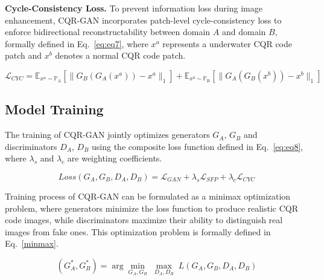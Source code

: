 \documentclass[preprint,12pt]{elsarticle}
\begin{document}
\textbf{Cycle-Consistency Loss.} To prevent information loss during image enhancement, CQR-GAN incorporates patch-level cycle-consistency loss to enforce bidirectional reconstructability between domain $A$ and domain $B$, formally defined in Eq.~\ref{eq:eq7}, where $x^a$ represents a underwater CQR code patch and $x^b$ denotes a normal CQR code patch.

\begin{equation}
    \mathcal{L}_{CYC} = \mathbb{E}_{x^a \sim \mathbb{P}_{\text{A}}} \left[ \| G_B(G_A(x^a)) - x^a \|_1 \right] + \mathbb{E}_{x^b \sim \mathbb{P}_{\text{B}}} \left[ \| G_A(G_B(x^b)) - x^b \|_1 \right]
    \label{eq:eq7}
\end{equation}


\subsection{Model Training}

The training of CQR-GAN jointly optimizes generators $G_A$, $G_B$ and discriminators $D_A$, $D_B$ using the composite loss function defined in Eq.~\ref{eq:eq8}, where $\lambda_s$ and $\lambda_c$ are weighting coefficients.

\begin{equation}
Loss(G_A,G_B,D_A,D_B)
= \mathcal{L}_{GAN}
+ \lambda_s\mathcal{L}_{SFP}
+ \lambda_c\mathcal{L}_{CYC}
\label{eq:eq8}
\end{equation}


Training process of CQR-GAN can be formulated as a minimax optimization problem, where generators minimize the loss function to produce realistic CQR code images, while discriminators maximize their ability to distinguish real images from fake ones. This optimization problem is formally defined in Eq.~\ref{minmax}.

\begin{equation}
(G_A^*,G_B^*)
= \arg\min_{G_A,G_B}\;\max_{D_A,D_B}\;
L(G_A,G_B,D_A,D_B)
\label{minmax}
\end{equation}

\end{document}
